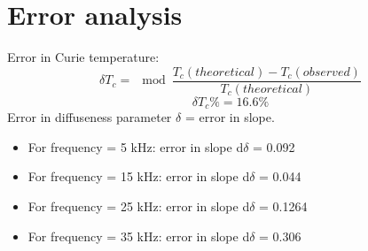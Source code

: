 \section{Error analysis}
    Error in Curie temperature:
    $$\delta T_c =\mod{{{\frac{T_c(theoretical)- T_c(observed)}{T_c(theoretical)}}}}$$
    $$\delta T_c \%= 16.6\%$$
    Error in diffuseness parameter $\delta$ = error in slope.
    \begin{itemize}
        \item  For frequency = 5 kHz: error in slope d$\delta$ = 0.092
        \item For frequency = 15 kHz: error in slope d$\delta$  = 0.044
        \item For frequency = 25 kHz: error in slope  d$\delta$ = 0.1264
        \item For frequency = 35 kHz: error in slope  d$\delta$ = 0.306
    \end{itemize}
